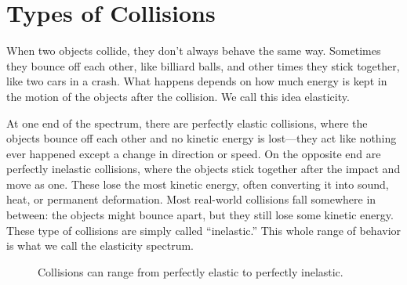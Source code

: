 \section{Types of Collisions}

When two objects collide, they don’t always behave the same way. Sometimes they bounce off each other, like billiard balls, and other times they stick together, like two cars in a crash. What happens depends on how much energy is kept in the motion of the objects after the collision. We call this idea elasticity.

      
At one end of the spectrum, there are perfectly \gls{elastic} collisions, where the objects bounce off each other and no kinetic energy is lost—they act like nothing ever happened except a change in direction or speed. On the opposite end are perfectly inelastic collisions, where the objects stick together after the impact and move as one. These lose the most kinetic energy, often converting it into sound, heat, or permanent deformation. Most real-world collisions fall somewhere in between: the objects might bounce apart, but they still lose some kinetic energy.  These type of collisions are simply called ``\gls{inelastic}.''  This whole range of behavior is what we call the elasticity spectrum.


\begin{figure}[h!]
	\begin{center}
\caption{Collisions can range from perfectly elastic to perfectly inelastic.}
\end{center}
\end{figure}	

